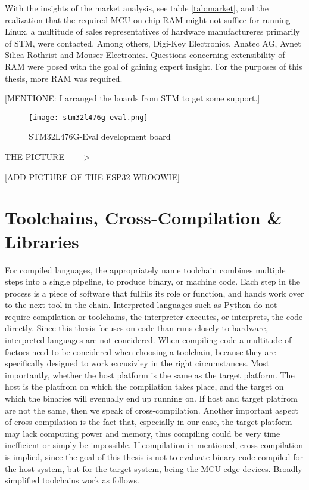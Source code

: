 With the insights of the market analysis, see table \ref{tab:market}, and the realization that the required MCU on-chip RAM might not suffice for running Linux, a multitude of sales representatives of hardware manufactureres primarily of STM, were contacted. Among others, Digi-Key Electronics, Anatec AG, Avnet Silica Rothrist and Mouser Electronics. Questions concerning extensibility of RAM were posed with the goal of gaining expert insight. For the purposes of this thesis, more RAM was required.

[MENTIONE: I arranged the boards from STM to get some support.]

\begin{figure}
\centering
\texttt{[image: stm32l476g-eval.png]}
\caption{STM32L476G-Eval development board~\cite{stm32Lpic}}
\label{fig:stm32l}
\end{figure}
THE PICTURE ------>\cite{stm32Lpic} 

[ADD PICTURE OF THE ESP32 WROOWIE]

\section{Toolchains, Cross-Compilation \& Libraries}\label{toolchains}
For compiled languages, the appropriately name toolchain combines multiple steps into a single pipeline, to produce binary, or machine code. Each step in the process is a piece of software that fullfils its role or function, and hands work over to the next tool in the chain. Interpreted languages such as Python do not require compilation or toolchains, the interpreter executes, or interprets, the code directly. Since this thesis focuses on code than runs closely to hardware, interpreted languages are not concidered. When compiling code a multitude of factors need to be concidered when choosing a toolchain, because they are specifically designed to work excusivley in the right circumstances. Most importantly, whether the host platform is the same as the target platform. The host is the platfrom on which the compilation takes place, and the target on which the binaries will evenually end up running on. If host and target platfrom are not the same, then we speak of cross-compilation. Another important aspect of cross-compilation is the fact that, especially in our case, the target platform may lack computing power and memory, thus compiling could be very time inefficient or simply be impossible. If compilation in mentioned, cross-compilation is implied, since the goal of this thesis is not to evaluate binary code compiled for the host system, but for the target system, being the MCU edge devices. Broadly simplified toolchains work as follows.

